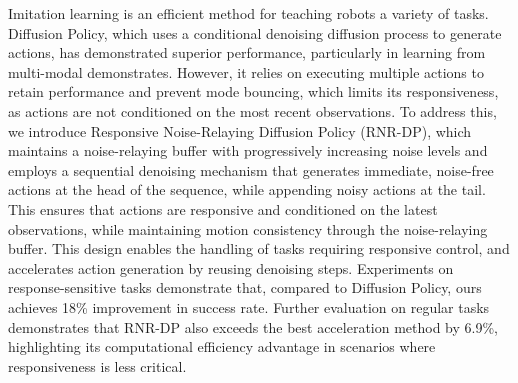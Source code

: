 Imitation learning is an efficient method for teaching robots a variety of tasks. Diffusion Policy, which uses a conditional denoising diffusion process to generate actions, has demonstrated superior performance, particularly in learning from multi-modal demonstrates. However, it relies on executing multiple actions to retain performance and prevent mode bouncing, which limits its responsiveness, as actions are not conditioned on the most recent observations. To address this, we introduce Responsive Noise-Relaying Diffusion Policy (RNR-DP), which maintains a noise-relaying buffer with progressively increasing noise levels and employs a sequential denoising mechanism that generates immediate, noise-free actions at the head of the sequence, while appending noisy actions at the tail. This ensures that actions are responsive and conditioned on the latest observations, while maintaining motion consistency through the noise-relaying buffer. This design enables the handling of tasks requiring responsive control, and accelerates action generation by reusing denoising steps. Experiments on response-sensitive tasks demonstrate that, compared to Diffusion Policy, ours achieves 18\% improvement in success rate. Further evaluation on regular tasks demonstrates that RNR-DP also exceeds the best acceleration method by 6.9\%, highlighting its computational efficiency advantage in scenarios where responsiveness is less critical.
